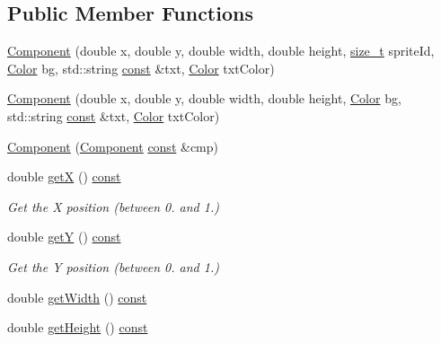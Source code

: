 \subsection*{Public Member Functions}
\begin{DoxyCompactItemize}
\item 
\hyperlink{classarcade_1_1_component_aece4316c5e98dcd0af1f6fc258923d0e}{Component} (double x, double y, double width, double height, \hyperlink{nc__alloc_8h_a7b60c5629e55e8ec87a4547dd4abced4}{size\-\_\-t} sprite\-Id, \hyperlink{unionarcade_1_1_color}{Color} bg, std\-::string \hyperlink{term__entry_8h_a57bd63ce7f9a353488880e3de6692d5a}{const} \&txt, \hyperlink{unionarcade_1_1_color}{Color} txt\-Color)
\item 
\hyperlink{classarcade_1_1_component_a6270430a97743ff123e21201cc937032}{Component} (double x, double y, double width, double height, \hyperlink{unionarcade_1_1_color}{Color} bg, std\-::string \hyperlink{term__entry_8h_a57bd63ce7f9a353488880e3de6692d5a}{const} \&txt, \hyperlink{unionarcade_1_1_color}{Color} txt\-Color)
\item 
\hyperlink{classarcade_1_1_component_af1a6366611e343f24d253dbd59ef3a47}{Component} (\hyperlink{classarcade_1_1_component}{Component} \hyperlink{term__entry_8h_a57bd63ce7f9a353488880e3de6692d5a}{const} \&cmp)
\item 
double \hyperlink{classarcade_1_1_component_aa9f5d26238ab9a3aa66581435ab342bd}{get\-X} () \hyperlink{term__entry_8h_a57bd63ce7f9a353488880e3de6692d5a}{const} 
\begin{DoxyCompactList}\small\item\em Get the X position (between 0. and 1.) \end{DoxyCompactList}\item 
double \hyperlink{classarcade_1_1_component_afc55425603d69eb6ffe7c68faf1217ea}{get\-Y} () \hyperlink{term__entry_8h_a57bd63ce7f9a353488880e3de6692d5a}{const} 
\begin{DoxyCompactList}\small\item\em Get the Y position (between 0. and 1.) \end{DoxyCompactList}\item 
double \hyperlink{classarcade_1_1_component_a5a994fc75526b28c2143f9d25c628c66}{get\-Width} () \hyperlink{term__entry_8h_a57bd63ce7f9a353488880e3de6692d5a}{const} 
\item 
double \hyperlink{classarcade_1_1_component_ad77e751bdeb37fcca268d22febb84a9f}{get\-Height} () \hyperlink{term__entry_8h_a57bd63ce7f9a353488880e3de6692d5a}{const} 

\end{DoxyCompactItemize}
